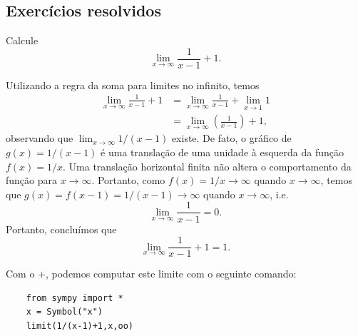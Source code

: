 \subsection*{Exercícios resolvidos}

\begin{exeresol}
  Calcule
  \begin{equation}
    \lim_{x\to \infty} \frac{1}{x-1}+1.
  \end{equation}
\end{exeresol}
\begin{resol}
  Utilizando a regra da soma para limites no infinito, temos
  \begin{align}
    \lim_{x\to\infty} \frac{1}{x-1} + 1 &= \lim_{x\to \infty} \frac{1}{x-1} + \lim_{x\to 1} 1\\
                                        &= \lim_{x\to \infty} \left(\frac{1}{x-1}\right)+1,
  \end{align}
  observando que $\lim_{x\to \infty}1/(x-1)$ existe. De fato, o gráfico de $g(x) = 1/(x-1)$ é uma translação de uma unidade à esquerda da função $f(x)=1/x$. Uma translação horizontal finita não altera o comportamento da função para $x\to \infty$. Portanto, como $f(x)=1/x\to\infty$ quando $x\to\infty$, temos que $g(x)=f(x-1)=1/(x-1)\to\infty$ quando $x\to\infty$, i.e.
  \begin{equation}
    \lim_{x\to\infty}\frac{1}{x-1} = 0.
  \end{equation}
  Portanto, concluímos que
  \begin{equation}
    \lim_{x\to \infty} \frac{1}{x-1} + 1 = 1. 
  \end{equation}

  \ifispython
  Com o {\python}+{\sympy}, podemos computar este limite com o seguinte comando:
  \begin{lstlisting}
    from sympy import *
    x = Symbol("x")
    limit(1/(x-1)+1,x,oo)
  \end{lstlisting}
  \fi
\end{resol}

